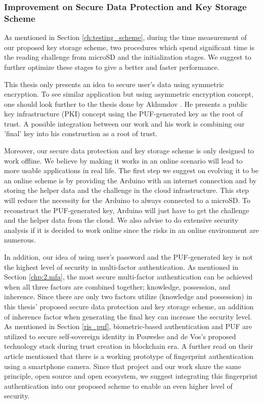 \subsubsection{Improvement on Secure Data Protection and Key Storage Scheme}
As mentioned in Section \ref{ch:testing_scheme}, during the time measurement of our proposed key storage scheme, two procedures which spend significant time is the reading challenge from microSD and the initialization stages. We suggest to further optimize these stages to give a better and faster performance.

This thesis only presents an idea to secure user's data using symmetric encryption. To see similar application but using asymmetric encryption concept, one should look further to the thesis done by Akhundov \cite{haji}. He presents a public key infrastructure (PKI) concept using the PUF-generated key as the root of trust. A possible integration between our work and his work is combining our 'final' key into his construction as a root of trust.

Moreover, our secure data protection and key storage scheme is only designed to work offline. We believe by making it works in an online scenario will lead to more usable applications in real life. The first step we suggest on evolving it to be an online scheme is by providing the Arduino with an internet connection and by storing the helper data and the challenge in the cloud infrastructure. This step will reduce the necessity for the Arduino to always connected to a microSD. To reconstruct the PUF-generated key, Arduino will just have to get the challenge and the helper data from the cloud. We also advise to do extensive security analysis if it is decided to work online since the risks in an online environment are numerous.

In addition, our idea of using user's password and the PUF-generated key is not the highest level of security in multi-factor authentication. As mentioned in Section \ref{chp:2.mfa}, the most secure multi-factor authentication can be achieved when all three factors are combined together; knowledge, possession, and inherence. Since there are only two factors utilize (knowledge and possession) in this thesis' proposed secure data protection and key storage scheme, an addition of inherence factor when generating the final key can increase the security level. As mentioned in Section \ref{ris_puf}, biometric-based authentication and PUF are utilized to secure self-sovereign identity in Pouwelse and de Vos's proposed technology stack during trust creation in blockchain era. A further read on their article mentioned that there is a working prototype of fingerprint authentication using a smartphone camera. Since that project and our work share the same principle, open source and open ecosystem, we suggest integrating this fingerprint authentication into our proposed scheme to enable an even higher level of security.
